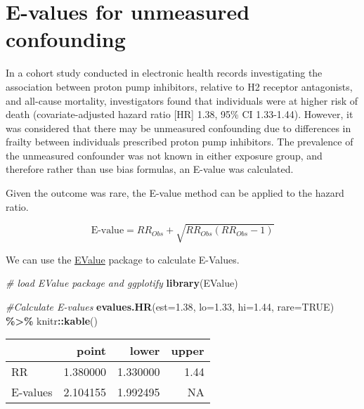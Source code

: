 \documentclass[
]{book}
\newenvironment{Shaded}{\begin{snugshade}}{\end{snugshade}}
\newcommand{\AttributeTok}[1]{\textcolor[rgb]{0.13,0.29,0.53}{#1}}
\newcommand{\CommentTok}[1]{\textcolor[rgb]{0.56,0.35,0.01}{\textit{#1}}}
\newcommand{\ConstantTok}[1]{\textcolor[rgb]{0.56,0.35,0.01}{#1}}
\newcommand{\FloatTok}[1]{\textcolor[rgb]{0.00,0.00,0.81}{#1}}
\newcommand{\FunctionTok}[1]{\textcolor[rgb]{0.13,0.29,0.53}{\textbf{#1}}}
\newcommand{\NormalTok}[1]{#1}
\newcommand{\SpecialCharTok}[1]{\textcolor[rgb]{0.81,0.36,0.00}{\textbf{#1}}}
\begin{document}
\hypertarget{e-values-for-unmeasured-confounding}{%
\section{E-values for unmeasured confounding}\label{e-values-for-unmeasured-confounding}}

In a cohort study conducted in electronic health records investigating the association between proton pump inhibitors, relative to H2 receptor antagonists, and all-cause mortality, investigators found that individuals were at higher risk of death (covariate-adjusted hazard ratio {[}HR{]} 1.38, 95\% CI 1.33-1.44).\citep{brown2021proton} However, it was considered that there may be unmeasured confounding due to differences in frailty between individuals prescribed proton pump inhibitors. The prevalence of the unmeasured confounder was not known in either exposure group, and therefore rather than use bias formulas, an E-value was calculated.\citep{ding2016sensitivity}

Given the outcome was rare, the E-value method can be applied to the hazard ratio.

\[
\text{E-value} = RR_{Obs} + \sqrt{RR_{Obs}(RR_{Obs} -1)}
\]

We can use the \href{https://cran.r-project.org/web/packages/EValue/index.html}{EValue} package to calculate E-Values.

\begin{Shaded}
\begin{Highlighting}[]
\CommentTok{\# load EValue package and ggplotify }
\FunctionTok{library}\NormalTok{(EValue)}

\CommentTok{\#Calculate E{-}values}
\FunctionTok{evalues.HR}\NormalTok{(}\AttributeTok{est=}\FloatTok{1.38}\NormalTok{, }\AttributeTok{lo=}\FloatTok{1.33}\NormalTok{, }\AttributeTok{hi=}\FloatTok{1.44}\NormalTok{, }\AttributeTok{rare=}\ConstantTok{TRUE}\NormalTok{) }\SpecialCharTok{\%\textgreater{}\%}\NormalTok{  knitr}\SpecialCharTok{::}\FunctionTok{kable}\NormalTok{()}
\end{Highlighting}
\end{Shaded}

\begin{tabular}{l|r|r|r}
\hline
  & point & lower & upper\\
\hline
RR & 1.380000 & 1.330000 & 1.44\\
\hline
E-values & 2.104155 & 1.992495 & NA\\
\hline
\end{tabular}
\end{document}

